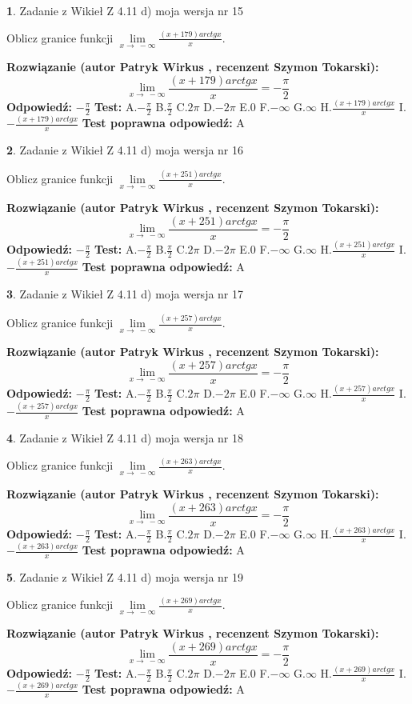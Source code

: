 \documentclass[12pt, a4paper]{article}
\theoremstyle{definition} %
\newtheorem{zad}{}
\newcommand{\zadStart}[1]{\begin{zad}#1\newline}
\newcommand{\zadStop}{\end{zad}}
\newcommand{\rozwStart}[2]{\noindent \textbf{Rozwiązanie (autor #1 , recenzent #2): }\newline}
\newcommand{\rozwStop}{\newline}
\newcommand{\odpStart}{\noindent \textbf{Odpowiedź:}\newline}
\newcommand{\odpStop}{\newline}
\newcommand{\testStart}{\noindent \textbf{Test:}\newline}
\newcommand{\testStop}{\newline}
\newcommand{\kluczStart}{\noindent \textbf{Test poprawna odpowiedź:}\newline}
\newcommand{\kluczStop}{\newline}
\begin{document}
\zadStart{Zadanie z Wikieł Z 4.11 d) moja wersja nr 15}

Oblicz granice funkcji $\lim\limits_{x\to\ -\infty}\frac{(x+179)arctgx}{x}$.
\zadStop
\rozwStart{Patryk Wirkus}{Szymon Tokarski}
$$\lim\limits_{x\to\ -\infty}\frac{(x+179)arctgx}{x} = -\frac{\pi}{2}$$
\rozwStop
\odpStart
$-\frac{\pi}{2}$
\odpStop
\testStart
A.$-\frac{\pi}{2}$ B.$\frac{\pi}{2}$ C.$2\pi$ D.$-2\pi$ E.$0$ F.$-\infty$ G.$\infty$ H.$\frac{(x+179)arctgx}{x}$ I.$-\frac{(x+179)arctgx}{x}$
\testStop
\kluczStart
A
\kluczStop



\zadStart{Zadanie z Wikieł Z 4.11 d) moja wersja nr 16}

Oblicz granice funkcji $\lim\limits_{x\to\ -\infty}\frac{(x+251)arctgx}{x}$.
\zadStop
\rozwStart{Patryk Wirkus}{Szymon Tokarski}
$$\lim\limits_{x\to\ -\infty}\frac{(x+251)arctgx}{x} = -\frac{\pi}{2}$$
\rozwStop
\odpStart
$-\frac{\pi}{2}$
\odpStop
\testStart
A.$-\frac{\pi}{2}$ B.$\frac{\pi}{2}$ C.$2\pi$ D.$-2\pi$ E.$0$ F.$-\infty$ G.$\infty$ H.$\frac{(x+251)arctgx}{x}$ I.$-\frac{(x+251)arctgx}{x}$
\testStop
\kluczStart
A
\kluczStop



\zadStart{Zadanie z Wikieł Z 4.11 d) moja wersja nr 17}

Oblicz granice funkcji $\lim\limits_{x\to\ -\infty}\frac{(x+257)arctgx}{x}$.
\zadStop
\rozwStart{Patryk Wirkus}{Szymon Tokarski}
$$\lim\limits_{x\to\ -\infty}\frac{(x+257)arctgx}{x} = -\frac{\pi}{2}$$
\rozwStop
\odpStart
$-\frac{\pi}{2}$
\odpStop
\testStart
A.$-\frac{\pi}{2}$ B.$\frac{\pi}{2}$ C.$2\pi$ D.$-2\pi$ E.$0$ F.$-\infty$ G.$\infty$ H.$\frac{(x+257)arctgx}{x}$ I.$-\frac{(x+257)arctgx}{x}$
\testStop
\kluczStart
A
\kluczStop



\zadStart{Zadanie z Wikieł Z 4.11 d) moja wersja nr 18}

Oblicz granice funkcji $\lim\limits_{x\to\ -\infty}\frac{(x+263)arctgx}{x}$.
\zadStop
\rozwStart{Patryk Wirkus}{Szymon Tokarski}
$$\lim\limits_{x\to\ -\infty}\frac{(x+263)arctgx}{x} = -\frac{\pi}{2}$$
\rozwStop
\odpStart
$-\frac{\pi}{2}$
\odpStop
\testStart
A.$-\frac{\pi}{2}$ B.$\frac{\pi}{2}$ C.$2\pi$ D.$-2\pi$ E.$0$ F.$-\infty$ G.$\infty$ H.$\frac{(x+263)arctgx}{x}$ I.$-\frac{(x+263)arctgx}{x}$
\testStop
\kluczStart
A
\kluczStop



\zadStart{Zadanie z Wikieł Z 4.11 d) moja wersja nr 19}

Oblicz granice funkcji $\lim\limits_{x\to\ -\infty}\frac{(x+269)arctgx}{x}$.
\zadStop
\rozwStart{Patryk Wirkus}{Szymon Tokarski}
$$\lim\limits_{x\to\ -\infty}\frac{(x+269)arctgx}{x} = -\frac{\pi}{2}$$
\rozwStop
\odpStart
$-\frac{\pi}{2}$
\odpStop
\testStart
A.$-\frac{\pi}{2}$ B.$\frac{\pi}{2}$ C.$2\pi$ D.$-2\pi$ E.$0$ F.$-\infty$ G.$\infty$ H.$\frac{(x+269)arctgx}{x}$ I.$-\frac{(x+269)arctgx}{x}$
\testStop
\kluczStart
A
\kluczStop
\end{document}
